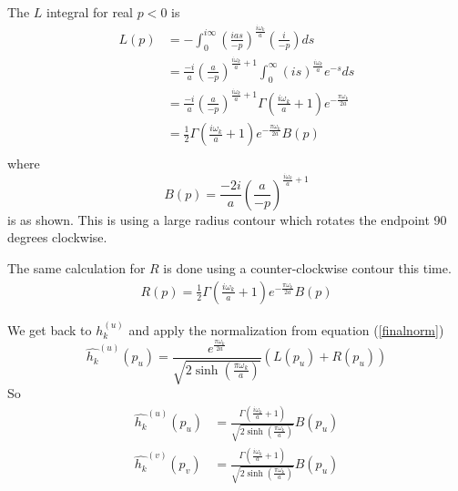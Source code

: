 \documentclass[12pt,a4paper]{article}
\begin{document}
The $L$ integral for real $p<0$ is
\begin{equation}
\begin{split}
  L(p) & = -\int_0^{i\infty} \left(\frac{ias}{-p}\right)^\frac{i\omega_k}{a} \left(\frac{i}{-p}\right)ds \\
  & = \frac{-i}{a} \left(\frac{a}{-p}\right)^{\frac{i\omega_k}{a} + 1} \int_0^\infty \left(is\right) ^ \frac{i\omega_k}{a} e^{-s} ds \\
  & = \frac{-i}{a} \left(\frac{a}{-p}\right)^{\frac{i\omega_k}{a} + 1} \Gamma\left(\frac{i\omega_k}{a} + 1\right) e^{-\frac{\pi \omega_k}{2a}} \\
  & = \frac{1}{2} \Gamma\left(\frac{i\omega_k}{a} + 1\right) e^{-\frac{\pi \omega_k}{2a}} B(p)\\
\end{split}
\end{equation}
where
\begin{equation}
B(p) = \frac{-2i}{a} \left(\frac{a}{-p}\right)^{\frac{i\omega_k}{a} + 1} 
\end{equation}
is as shown.  This is using a large radius contour which rotates the endpoint 90 degrees clockwise.

The same calculation for $R$ is done using a counter-clockwise contour this time.
\begin{equation}
\begin{split}
  R(p) = \frac{1}{2}\Gamma\left(\frac{i\omega_k}{a} + 1\right) e^{-\frac{\pi \omega_k}{2a}} B(p)
\end{split}
\end{equation}

We get back to $h_k^{(u)}$ and apply the normalization from equation (\ref{finalnorm})
\begin{equation}
\hat{h_k}^{(u)}(p_u) = \frac{e^{\frac{\pi \omega_k}{2a}}}{\sqrt{2 \sinh \left({\frac{\pi\omega_k}{a}}\right)}}  ( L(p_u) + R(p_u) )
\end{equation}
So
\begin{equation}
\label{fourier}
\begin{split}
\hat{h_k}^{(u)}(p_u) & = \frac{\Gamma\left(\frac{i\omega_k}{a} + 1\right)}{\sqrt{2 \sinh \left({\frac{\pi\omega_k}{a}}\right)}} B(p_u)\\
\hat{h_k}^{(v)}(p_v) &= \frac{\Gamma\left(\frac{i\omega_k}{a} + 1\right)}{\sqrt{2 \sinh \left({\frac{\pi\omega_k}{a}}\right)}} B(p_u)
\end{split}
\end{equation}
\end{document}

